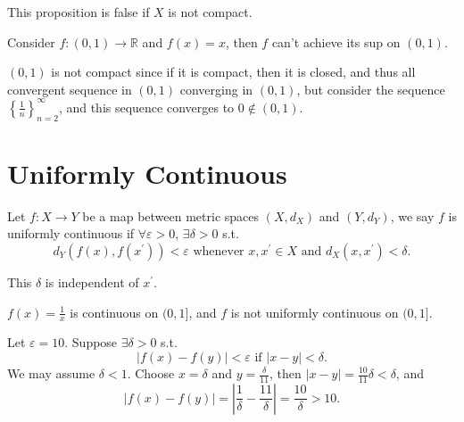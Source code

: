 
\begin{eg}
    This proposition is false if \(X\) is not compact.  
\end{eg}
\begin{explanation}
    Consider \(f:(0, 1) \to \mathbb{R} \) and \(f(x) =x\), then \(f\) can't achieve its sup on \((0, 1)\).
    \begin{note}
        \((0, 1)\) is not compact since if it is compact, then it is closed, and thus all convergent sequence in \((0, 1)\) converging in \((0, 1)\), but consider the sequence \(\left\{ \frac{1}{n} \right\}_{n=2}^{\infty}  \), and this sequence converges to \(0 \notin (0, 1)\).     
    \end{note}    
\end{explanation}
\section{Uniformly Continuous}
\begin{definition} \label{def: uniformly conti}
    Let \(f:X \to Y\) be a map between metric spaces \((X, d_X)\) and \((Y, d_Y)\), we say \(f\) is uniformly continuous if \(\forall\varepsilon > 0\), \(\exists \delta > 0\) s.t. 
    \[
        d_Y (f(x), f \left( x^{\prime}  \right) ) < \varepsilon \text{ whenever } x, x^{\prime} \in X \text{ and } d_X \left( x, x^{\prime}  \right) < \delta. 
    \]      
\end{definition}

\begin{remark}
    This \(\delta \) is independent of \(x^{\prime} \). 
\end{remark}

\begin{eg}
    \(f(x)= \frac{1}{x}\) is continuous on \((0, 1]\), and \(f\) is not uniformly continuous on \((0, 1]\).    
\end{eg}
\begin{explanation}
    Let \(\varepsilon = 10\). Suppose \(\exists \delta > 0\) s.t. 
    \[
        \left\vert f(x) - f(y) \right\vert < \varepsilon \text{ if } \vert x - y \vert < \delta. 
    \]  
    We may assume \(\delta < 1\). Choose \(x = \delta \) and \(y = \frac{\delta}{11}\), then \(\vert x - y \vert = \frac{10}{11} \delta < \delta  \), and 
    \[
        \vert f(x) - f(y)  \vert = \left\vert \frac{1}{\delta } - \frac{11}{\delta } \right\vert  = \frac{10}{\delta } > 10.
    \]    
\end{explanation}

